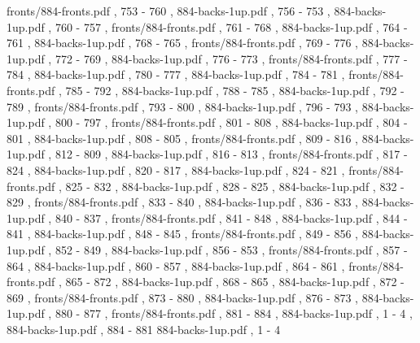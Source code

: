 \documentclass[letterpaper]{article}
\begin{document}
{			fronts/884-fronts.pdf	,	753	-	760	,
			884-backs-1up.pdf		,	756	-	753	,
			884-backs-1up.pdf		,	760	-	757	,
			fronts/884-fronts.pdf	,	761	-	768	,
			884-backs-1up.pdf		,	764	-	761	,
			884-backs-1up.pdf		,	768	-	765	,
			fronts/884-fronts.pdf	,	769	-	776	,
			884-backs-1up.pdf		,	772	-	769	,
			884-backs-1up.pdf		,	776	-	773	,
			fronts/884-fronts.pdf	,	777	-	784	,
			884-backs-1up.pdf		,	780	-	777	,
			884-backs-1up.pdf		,	784	-	781	,
			fronts/884-fronts.pdf	,	785	-	792	,
			884-backs-1up.pdf		,	788	-	785	,
			884-backs-1up.pdf		,	792	-	789	,
			fronts/884-fronts.pdf	,	793	-	800	,
			884-backs-1up.pdf		,	796	-	793	,
			884-backs-1up.pdf		,	800	-	797	,
			fronts/884-fronts.pdf	,	801	-	808	,
			884-backs-1up.pdf		,	804	-	801	,
			884-backs-1up.pdf		,	808	-	805	,
			fronts/884-fronts.pdf	,	809	-	816	,
			884-backs-1up.pdf		,	812	-	809	,
			884-backs-1up.pdf		,	816	-	813	,
			fronts/884-fronts.pdf	,	817	-	824	,
			884-backs-1up.pdf		,	820	-	817	,
			884-backs-1up.pdf		,	824	-	821	,
			fronts/884-fronts.pdf	,	825	-	832	,
			884-backs-1up.pdf		,	828	-	825	,
			884-backs-1up.pdf		,	832	-	829	,
			fronts/884-fronts.pdf	,	833	-	840	,
			884-backs-1up.pdf		,	836	-	833	,
			884-backs-1up.pdf		,	840	-	837	,
			fronts/884-fronts.pdf	,	841	-	848	,
			884-backs-1up.pdf		,	844	-	841	,
			884-backs-1up.pdf		,	848	-	845	,
			fronts/884-fronts.pdf	,	849	-	856	,
			884-backs-1up.pdf		,	852	-	849	,
			884-backs-1up.pdf		,	856	-	853	,
			fronts/884-fronts.pdf	,	857	-	864	,
			884-backs-1up.pdf		,	860	-	857	,
			884-backs-1up.pdf		,	864	-	861	,
			fronts/884-fronts.pdf	,	865	-	872	,
			884-backs-1up.pdf		,	868	-	865	,
			884-backs-1up.pdf		,	872	-	869	,
			fronts/884-fronts.pdf	,	873	-	880	,
			884-backs-1up.pdf		,	876	-	873	,
			884-backs-1up.pdf		,	880	-	877	,
			fronts/884-fronts.pdf	,	881	-	884	,
			884-backs-1up.pdf		,  1		-	4		,
			884-backs-1up.pdf		,	884	- 881
			884-backs-1up.pdf		,  1		-	4
		}
\end{document}

